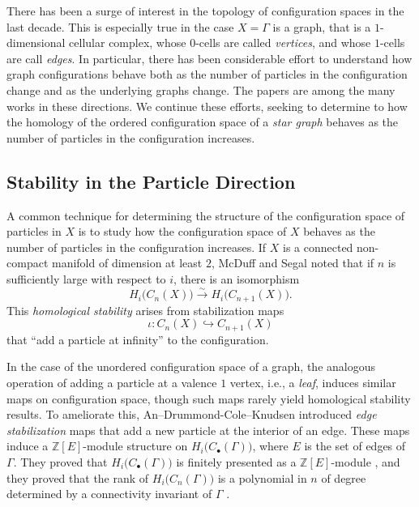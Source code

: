 \documentclass[pagebackref,colorlinks,citecolor=blue,linkcolor=blue,urlcolor=blue,filecolor=blue]{article}
\theoremstyle{definition}\newtheorem{definition}[thm]{Definition}
\theoremstyle{definition}
\newcommand{\Z}{\ensuremath{\mathbb{Z}}}
\begin{document}
There has been a surge of interest in the topology of configuration spaces in the last decade.
This is especially true in the case $X=\Gamma$ is a graph, that is a $1$-dimensional cellular complex, whose $0$-cells are called \emph{vertices}, and whose $1$-cells are call \emph{edges}.
In particular, there has been considerable effort to understand how graph configurations behave both as the number of particles in the configuration change and as the underlying graphs change.
The papers \cite{an2020edge, an2022asymptotic, aguilar2022farley, an2022second, an2021geometric, chettih2016dancing, chettih2018homology, gonzalez2022cohomology, Lut2017thesis, lutgehetmann2017representation, ramos2020application} are among the many works in these directions.
We continue these efforts, seeking to determine to how the homology of the ordered configuration space of a \emph{star graph} behaves as the number of particles in the configuration increases.

\subsection{Stability in the Particle Direction}
A common technique for determining the structure of the configuration space of particles in $X$ is to study 
how the configuration space of $X$ behaves as the number of particles in the configuration increases.
If $X$ is a connected non-compact manifold of dimension at least $2$, McDuff \cite{mcduff1975configuration} and Segal \cite{segal1979topology} noted that if $n$ is sufficiently large with respect to $i$, there is an isomorphism
\[
H_{i}\big(C_{n}(X)\big)\xrightarrow{\sim} H_{i}\big(C_{n+1}(X)\big).
\]
This \emph{homological stability} arises from stabilization maps
\[
\iota:C_{n}(X)\hookrightarrow C_{n+1}(X)
\]
that ``add a particle at infinity'' to the configuration.

In the case of the unordered configuration space of a graph, the analogous operation of adding a particle at a valence $1$ vertex, i.e., a \emph{leaf}, induces similar maps on configuration space, though such maps rarely yield homological stability results.
To ameliorate this, An--Drummond-Cole--Knudsen \cite{an2020edge} introduced \emph{edge stabilization} maps that add a new particle at the interior of an edge.
These maps induce a $\Z[E]$-module structure on $H_{i}\big(C_{\bullet}(\Gamma)\big)$, where $E$ is the set of edges of $\Gamma$.
They proved that $H_{i}\big(C_{\bullet}(\Gamma)\big)$ is finitely presented as a $\Z[E]$-module \cite[Theorem 1.1]{an2020edge}, and they proved that the rank of $H_{i}\big(C_{n}(\Gamma)\big)$ is a polynomial in $n$ of degree determined by a connectivity invariant of $\Gamma$ \cite[Theorem 1.2]{an2020edge}.
\end{document}
